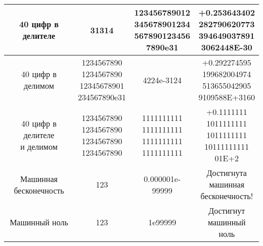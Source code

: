 \begin{longtable}{|c|c|c|c|}
	\hline
	40 цифр в делителе & 31314 & \makecell{123456789012\\345678901234\\567890123456\\7890e31} & \makecell{+0.253643402\\282790620773\\394649037891\\3062448E-30} \\
	\hline
	40 цифр в делимом & \makecell{1234567890\\1234567890\\12345678901\\234567890e31} & 4224e-3124 & \makecell{+0.292274595\\199682004974\\513655042905\\9109588E+3160} \\
	\hline
	\makecell{40 цифр в делителе\\и делимом} & \makecell{1234567890\\1234567890\\1234567890\\1234567890} & \makecell{1111111111\\1111111111\\1111111111\\1111111111} & \makecell{+0.1111111\\1011111111\\1011111111\\10111111111\\01E+2} \\
	\hline
	\makecell{Машинная\\бесконечность}& 123 & 0.000001e-99999 &\makecell{Достигнута\\машинная\\бесконечность!}\\
	\hline
	Машинный ноль & 123 & 1e99999 & \makecell{Достигнут\\машинный\\ноль }\\
	\hline
\end{longtable}

